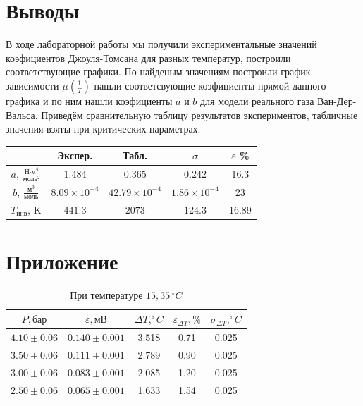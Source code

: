 \documentclass[a4paper,12pt]{article}
\begin{document}
\section{Выводы}

В ходе лабораторной работы мы получили экспериментальные значений коэфициентов Джоуля-Томсана для разных температур, построили соответствующие графики. По найденым значениям построили график зависимости $\mu(\frac{1}{T})$ нашли соответсвующие коэфициенты прямой данного графика и по ним нашли коэфициенты $a$ и $b$ для модели реального газа Ван-Дер-Вальса. Приведём сравнительную таблицу результатов  экспериментов, табличные значения взяты при критических параметрах.

\begin{table}[h!]
    \centering
    \begin{tabular}{|c|c|c|c|c|}
        \hline
                                                  & Экспер.      & Табл. & $\sigma$ & $\varepsilon$ \%  \\ \hline
        $a$, $\frac{\text{Н·м}^4}{\text{моль}^2}$ & $1.484$ & $0.365$ & $0.242$ &  16.3\\ \hline
        $b$, $\frac{\text{м}^3}{\text{моль}}$     & $8.09 \times 10^{-4}$ & $42.79 \times 10^{-4} $ & $1.86 \times 10^{-4}$ & 23 \\\hline
        $T_{\text{инв}}$, K                       & $441.3$ & $2073$ & $124.3$  & 16.89\\ \hline
    \end{tabular}
    \label{tab:vanderWaals}
\end{table}



\section{Приложение}



\begin{table}[h!]
    \centering
    \begin{tabular}{|c|c|c|c|c|}
        \hline
        $P, \text{бар}$ & $\varepsilon, \text{мВ}$ & $\Delta T, ^\circ C$ & $\varepsilon_{\Delta T}, \%$ & $\sigma_{\Delta T}, ^\circ C$ \\
        \hline
        $4.10 \pm 0.06$ & $0.140 \pm 0.001$ & 3.518 & 0.71 & 0.025 \\ \hline
        $3.50 \pm 0.06$ & $0.111 \pm 0.001$ & 2.789 & 0.90 & 0.025 \\ \hline
        $3.00 \pm 0.06$ & $0.083 \pm 0.001$ & 2.085 & 1.20 & 0.025 \\ \hline
        $2.50 \pm 0.06$ & $0.065 \pm 0.001$ & 1.633 & 1.54 & 0.025 \\ \hline
    \end{tabular}
    \caption{При температуре $15,35\,^\circ C$}
    \label{tab:15C}
\end{table}
\end{document}
